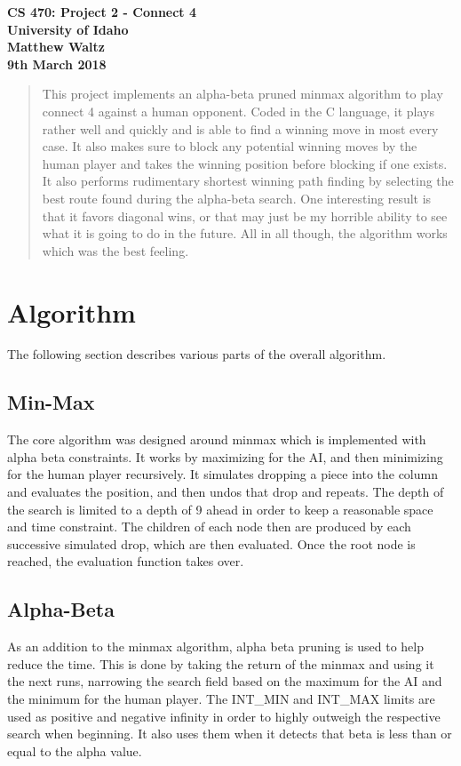 \documentclass[11pt,letterpaper]{article}
\author{Matthew Waltz}
\begin{document}
\begin{center}
   \textbf{CS 470: Project 2 - Connect 4} \\
   \textbf{University of Idaho} \\
   \textbf{Matthew Waltz} \\
   \textbf{9th March 2018} \\
\end{center}

\begin{abstract}
This project implements an alpha-beta pruned minmax algorithm to play connect 4 against a human opponent. Coded in the C language, it plays rather well and quickly and is able to find a winning move in most every case. It also makes sure to block any potential winning moves by the human player and takes the winning position before blocking if one exists. It also performs rudimentary shortest winning path finding by selecting the best route found during the alpha-beta search. One interesting result is that it favors diagonal wins, or that may just be my horrible ability to see what it is going to do in the future. All in all though, the algorithm works which was the best feeling.
\end{abstract}

\tableofcontents

\clearpage
\section{Algorithm}
The following section describes various parts of the overall algorithm.

\subsection{Min-Max}
The core algorithm was designed around minmax which is implemented with alpha beta constraints.
It works by maximizing for the AI, and then minimizing for the human player recursively. It simulates dropping a piece into the column and evaluates the position, and then undos that drop and repeats. The depth of the search is limited to a depth of 9 ahead in order to keep a reasonable space and time constraint. The children of each node then are produced by each successive simulated drop, which are then evaluated. Once the root node is reached, the evaluation function takes over.

\subsection{Alpha-Beta}
As an addition to the minmax algorithm, alpha beta pruning is used to help reduce the time.
This is done by taking the return of the minmax and using it the next runs, narrowing the search field based on the maximum for the AI and the minimum for the human player.
The INT\_MIN and INT\_MAX limits are used as positive and negative infinity in order to highly outweigh the respective search when beginning. It also uses them when it detects that beta is less than or equal to the alpha value.
\end{document}
